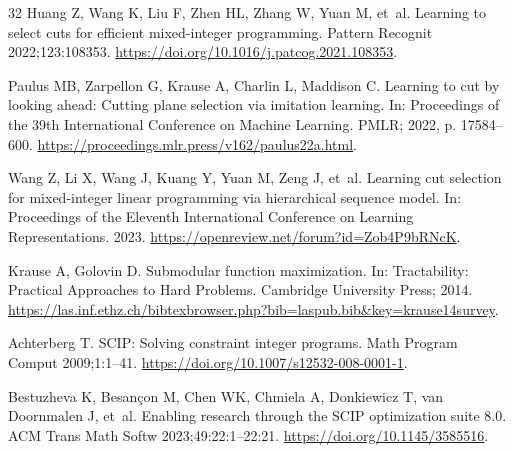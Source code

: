 \documentclass[final,5p,times,twocolumn]{elsarticle}
\begin{document}
\begin{thebibliography}{32}
Huang Z, Wang K, Liu F, Zhen HL, Zhang W, Yuan M, et~al. Learning to select cuts for efficient mixed-integer programming.
Pattern Recognit 2022;123:108353.
\url{https://doi.org/10.1016/j.patcog.2021.108353}.

Paulus MB, Zarpellon G, Krause A, Charlin L, Maddison C. Learning to cut by looking ahead: Cutting plane selection via imitation learning.
In: Proceedings of the 39th International Conference on Machine Learning. PMLR; 2022, p. 17584--600.
\url{https://proceedings.mlr.press/v162/paulus22a.html}.

Wang Z, Li X, Wang J, Kuang Y, Yuan M, Zeng J, et~al. Learning cut selection for mixed-integer linear programming via hierarchical sequence model.
In: Proceedings of the Eleventh International Conference on Learning Representations. 2023.
\url{https://openreview.net/forum?id=Zob4P9bRNcK}.

\balance
{}
Krause A, Golovin D. Submodular function maximization.
In: Tractability: Practical Approaches to Hard Problems. Cambridge University Press; 2014.
\url{https://las.inf.ethz.ch/bibtexbrowser.php?bib=laspub.bib\&key=krause14survey}.

Achterberg T. {SCIP}: Solving constraint integer programs.
Math Program Comput 2009;1:1--41.
\url{https://doi.org/10.1007/s12532-008-0001-1}.

Bestuzheva K, Besan{\c{c}}on M, Chen WK, Chmiela A, Donkiewicz T, van Doornmalen J, et~al. Enabling research through the {SCIP} optimization suite 8.0.
ACM Trans Math Softw 2023;49:22:1--22:21.
\url{https://doi.org/10.1145/3585516}.

\end{thebibliography}
\end{document}
